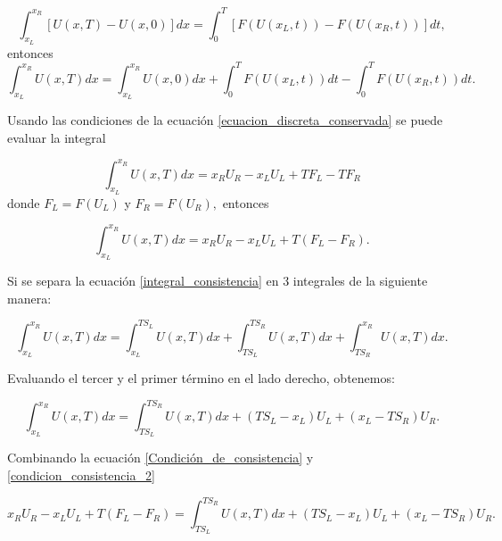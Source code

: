\documentclass[12pt,a4paper]{book}
\begin{document}
\begin{equation*}\label{Forma_integral_conservadas}
\int_{x_L}^{x_R} \left[ U\left( x, T \right) -
 U\left( x, 0 \right) \right] dx = 
 \int_{0}^{T} \left[ F \left(U\left( x_L, t \right) \right) -
 F \left(U\left( x_R, t \right) \right) \right] dt, 
\end{equation*}
entonces
\begin{equation}\label{integral_consistencia}
\int_{x_L}^{x_R} U\left( x, T \right) dx =\int_{x_L}^{x_R} U\left( x, 0 \right) dx+
\int_{0}^{T}  F \left(U\left( x_L, t \right) \right)dt -
\int_{0}^{T}  F \left(U\left( x_R, t \right) \right) dt.
\end{equation}

\noindent Usando las condiciones de la ecuación \ref{ecuacion_discreta_conservada} se puede evaluar la integral

\begin{equation*}
\int_{x_L}^{x_R} U\left( x, T \right) dx = 
x_R U_R -x_L U_L+T F_L-T F_R
\end{equation*}
donde $F_L = F \left( U_L \right)$ y $F_R = F \left( U_R \right),$ 
entonces

\begin{equation}\label{Condición_de_consistencia}
\int_{x_L}^{x_R} U\left( x, T \right) dx = 
x_R U_R -x_L U_L+T \left( F_L- F_R \right).
\end{equation}

\noindent Si se separa la ecuación \ref{integral_consistencia} en 3 integrales de la siguiente manera:

\begin{equation}
\int_{x_L}^{x_R} U\left( x, T \right) dx = 
\int_{x_L}^{T S_L} U \left(x, T \right)dx+
\int_{T S_L}^{T S_R} U \left(x, T \right)dx+
\int_{T S_R}^{x_R} U \left(x, T \right)dx.
\end{equation}

\noindent Evaluando el tercer y el primer término en el lado derecho, obtenemos:

\begin{equation}\label{condicion_consistencia_2}
\int_{x_L}^{x_R} U\left( x, T \right) dx =
\int_{T S_L}^{T S_R} U \left(x, T \right)dx+
\left( T S_L - x_L \right) U_L+
\left( x_L - T S_R \right) U_R.
\end{equation}

\noindent Combinando la ecuación \ref{Condición_de_consistencia} y 
\ref{condicion_consistencia_2}

\begin{equation*}
x_R U_R -x_L U_L+T \left( F_L- F_R \right) =
\int_{T S_L}^{T S_R} U \left(x, T \right)dx+
\left( T S_L - x_L \right) U_L+
\left( x_L - T S_R \right) U_R.
\end{equation*}
\end{document}
